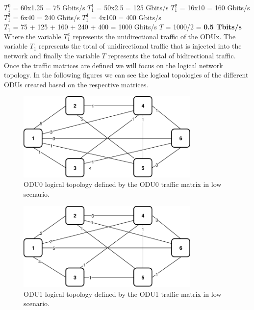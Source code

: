 $T_1^0$ = 60x1.25 = 75 Gbits/s \qquad
$T_1^1$ = 50x2.5 = 125 Gbits/s \qquad
$T_1^2$ = 16x10 = 160 Gbits/s \\

$T_1^3$ = 6x40 = 240 Gbits/s \quad
$T_1^4$ = 4x100 = 400 Gbits/s \\

$T_{1}$ = 75 + 125 + 160 + 240 + 400 = 1000 Gbits/s \qquad
$T$ = 1000/2 = \textbf{0.5 Tbits/s}\\

Where the variable $T_1^x$ represents the unidirectional traffic of the ODUx. The variable $T_{1}$ represents the total of unidirectional traffic that is injected into the network and finally the variable $T$ represents the total of bidirectional traffic.\\

Once the traffic matrices are defined we will focus on the logical network topology. In the following figures we can see the logical topologies of the different ODUs created based on the respective matrices.\\

\begin{figure}[h!]
\centering
\includegraphics[width=9cm]{sdf/ilp/opaque_survivability/figures/logical_topology_ODU0_low}
\caption{ODU0 logical topology defined by the ODU0 traffic matrix in low scenario.}
\label{logical_ODU0_low}
\end{figure}
\newpage
\begin{figure}[h!]
\centering
\includegraphics[width=9cm]{sdf/ilp/opaque_survivability/figures/logical_topology_ODU1_low}
\caption{ODU1 logical topology defined by the ODU1 traffic matrix in low scenario.}
\label{logical_ODU1_low}
\end{figure}


